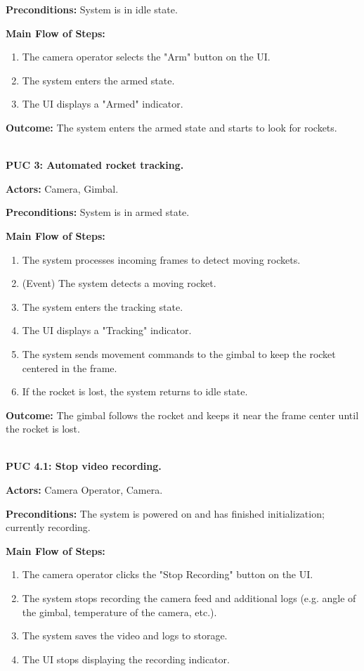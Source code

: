\documentclass[12pt]{article}
\begin{document}
\textbf{Preconditions:} System is in idle state.

\textbf{Main Flow of Steps:}
\begin{enumerate}
  \item The camera operator selects the "Arm" button on the UI.
  \item The system enters the armed state.
  \item The UI displays a "Armed" indicator.
\end{enumerate}

\textbf{Outcome:} The system enters the armed state and starts to look for rockets.

~\\

\textbf{PUC 3: Automated rocket tracking.}

\textbf{Actors:} Camera, Gimbal.

\textbf{Preconditions:} System is in armed state.

\textbf{Main Flow of Steps:}
\begin{enumerate}
  \item The system processes incoming frames to detect moving rockets.
  \item (Event) The system detects a moving rocket.
  \item The system enters the tracking state.
  \item The UI displays a "Tracking" indicator.
  \item The system sends movement commands to the gimbal to keep the rocket centered in
        the frame.
  \item If the rocket is lost, the system returns to idle state.
\end{enumerate}

\textbf{Outcome:} The gimbal follows the rocket and keeps it near the frame center until the rocket is lost.

~\\

\textbf{PUC 4.1: Stop video recording.}

\textbf{Actors:} Camera Operator, Camera.

\textbf{Preconditions:} The system is powered on and has finished initialization; currently recording.

\textbf{Main Flow of Steps:}
\begin{enumerate}
  \item The camera operator clicks the "Stop Recording" button on the UI.
  \item The system stops recording the camera feed and additional logs (e.g. angle of
        the gimbal, temperature of the camera, etc.).
  \item The system saves the video and logs to storage.
  \item The UI stops displaying the recording indicator.

\end{enumerate}
\end{document}
